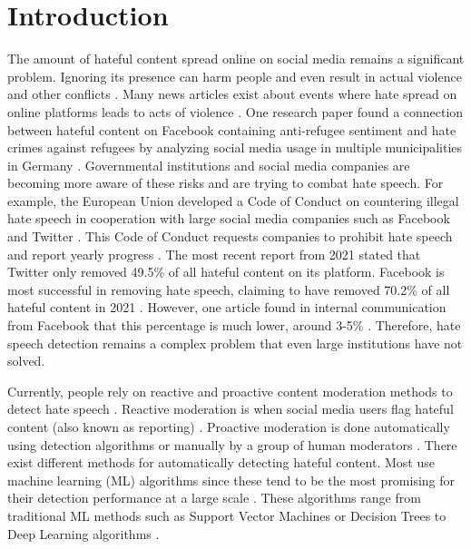 \chapter{Introduction}
\label{ch:introduction}
\newcommand{\customtextbox}[1]{
	\setlength{\fboxsep}{0.5em}
	\fbox{
		\begin{minipage}{\linewidth-1.7em}
			\vspace*{0.25em}
			#1
		\end{minipage}
	}
}

The amount of hateful content spread online on social media remains a significant problem.
%
Ignoring its presence can harm people and even result in actual violence and other conflicts \citep{ecri-hate-speech-and-violence, balayn2021automatic}.
%
Many news articles exist about events where hate spread on online platforms leads to acts of violence \citep{columbia-facebook-linked-to-violence, mujib-mashal-india, paul-mozur-2018, muller2021fanning}.
%
One research paper found a connection between hateful content on Facebook containing anti-refugee sentiment and hate crimes against refugees by analyzing social media usage in multiple municipalities in Germany \citep{muller2021fanning}.
%
Governmental institutions and social media companies are becoming more aware of these risks and are trying to combat hate speech.
%
For example, the European Union developed a Code of Conduct on countering illegal hate speech in cooperation with large social media companies such as Facebook and Twitter \citep{eu-code-of-conduct}.
%
This Code of Conduct requests companies to prohibit hate speech and report yearly progress \citep{eu-code-of-conduct}.
%
The most recent report from 2021 stated that Twitter only removed 49.5\% of all hateful content on its platform.
%
Facebook is most successful in removing hate speech, claiming to have removed 70.2\% of all hateful content in 2021 \citep{eu-code-of-conduct}.
%
However, one article found in internal communication from Facebook that this percentage is much lower, around 3-5\% \citep{noah2021giansiracusa}.
%
Therefore, hate speech detection remains a complex problem that even large institutions have not solved.

Currently, people rely on reactive and proactive content moderation methods to detect hate speech \citep{klonick2017new}.
%
Reactive moderation is when social media users flag hateful content (also known as reporting) \citep{klonick2017new}.
%
Proactive moderation is done automatically using detection algorithms or manually by a group of human moderators \citep{klonick2017new}.
%
There exist different methods for automatically detecting hateful content.
%
Most use machine learning (ML) algorithms since these tend to be the most promising for their detection performance at a large scale \citep{balayn2021automatic, fortuna2018survey}.
%
These algorithms range from traditional ML methods such as Support Vector Machines or Decision Trees to Deep Learning algorithms \citep{fortuna2018survey}.
%

